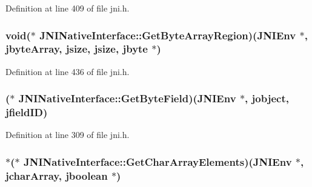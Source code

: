 Definition at line 409 of file jni.\-h.

\hypertarget{struct_j_n_i_native_interface_a6b5cd7b5b01c441fe82d549ca08ce8d6}{
\subsubsection[{Get\-Byte\-Array\-Region}]{\setlength{\rightskip}{0pt plus 5cm}void($\ast$ J\-N\-I\-Native\-Interface\-::\-Get\-Byte\-Array\-Region)({\bf J\-N\-I\-Env} $\ast$, {\bf jbyte\-Array}, {\bf jsize}, {\bf jsize}, {\bf jbyte} $\ast$)}}\label{struct_j_n_i_native_interface_a6b5cd7b5b01c441fe82d549ca08ce8d6}


Definition at line 436 of file jni.\-h.

\hypertarget{struct_j_n_i_native_interface_a6c097a60f2a59fce68e589ed47688c49}{
\subsubsection[{Get\-Byte\-Field}]{($\ast$ J\-N\-I\-Native\-Interface\-::\-Get\-Byte\-Field)({\bf J\-N\-I\-Env} $\ast$, {\bf jobject}, {\bf jfield\-I\-D})}}\label{struct_j_n_i_native_interface_a6c097a60f2a59fce68e589ed47688c49}


Definition at line 309 of file jni.\-h.

\hypertarget{struct_j_n_i_native_interface_a2d5b7536bac403885e4506cc0ae6492b}{
\subsubsection[{Get\-Char\-Array\-Elements}]{$\ast$($\ast$ J\-N\-I\-Native\-Interface\-::\-Get\-Char\-Array\-Elements)({\bf J\-N\-I\-Env} $\ast$, {\bf jchar\-Array}, {\bf jboolean} $\ast$)}}\label{struct_j_n_i_native_interface_a2d5b7536bac403885e4506cc0ae6492b}



